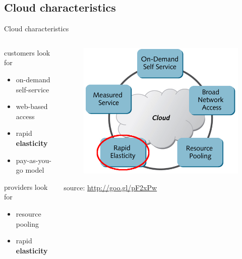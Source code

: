 \subsection{Cloud characteristics}
\begin{frame}{Cloud characteristics}
	\begin{columns}
		\begin{column}{0.5\textwidth}
			customers look for
			\begin{itemize}
				\item{\footnotesize{on-demand self-service}}
				\item{\footnotesize{web-based access}}
				\item{\footnotesize{rapid \textbf{elasticity}}}
				\item{\footnotesize{pay-as-you-go model}}
			\end{itemize}
			providers look for
			\begin{itemize}
				\item{\footnotesize{resource pooling}}
				\item{\footnotesize{rapid \textbf{elasticity}}}
			\end{itemize}
		\end{column}
		\begin{column}{0.5\textwidth}
			\begin{figure}
				\centering{}
				\includegraphics[scale=0.25]{images/cloud-characteristics-selected.png}
			\end{figure}
			\begin{flushright}
				\tiny{source: \url{http://goo.gl/pF2xPw}}
			\end{flushright}
		\end{column}
	\end{columns}
\end{frame}

